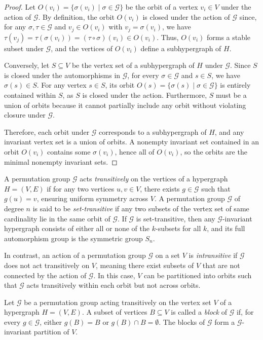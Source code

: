 \begin{proof}
Let $O(v_i)=\{\sigma(v_i)\mid\sigma\in\mathcal{G}\}$ be the orbit of a vertex $v_i\in V$ under the action of $\mathcal{G}$. By definition, the orbit $O(v_i)$ is closed under the action of $\mathcal{G}$ since, for any $\sigma,\tau\in\mathcal{G}$ and $v_j\in O(v_i)$ with $v_j=\sigma(v_i)$, we have $\tau(v_j)=\tau(\sigma(v_i))=(\tau\circ\sigma)(v_i)\in O(v_i)$. Thus, $O(v_i)$ forms a stable subset under $\mathcal{G}$, and the vertices of $O(v_i)$ define a subhypergraph of $H$.

Conversely, let $S\subseteq V$ be the vertex set of a subhypergraph of $H$ under $\mathcal{G}$. Since $S$ is closed under the automorphisms in $\mathcal{G}$, for every $\sigma\in\mathcal{G}$ and $s\in S$, we have $\sigma(s)\in S$. For any vertex $s\in S$, its orbit $O(s)=\{\sigma(s)\mid\sigma\in\mathcal{G}\}$ is entirely contained within $S$, as $S$ is closed under the action. Furthermore, $S$ must be a union of orbits because it cannot partially include any orbit without violating closure under $\mathcal{G}$.

Therefore, each orbit under $\mathcal{G}$ corresponds to a subhypergraph of $H$, and any invariant vertex set is a union of orbits. A nonempty invariant set contained in an orbit $O(v_i)$ contains some $\sigma(v_i)$, hence all of $O(v_i)$, so the orbits are the minimal nonempty invariant sets.
\end{proof}

A permutation group $\mathcal{G}$ acts \emph{transitively} on the vertices of a hypergraph $H=(V,E)$ if for any two vertices $u,v\in V$, there exists $g\in\mathcal{G}$ such that $g(u)=v$, ensuring uniform symmetry across $V$. A permutation group $\mathcal{G}$ of degree $n$ is said to be \emph{set-transitive} if any two subsets of the vertex set of same cardinality lie in the same orbit of $\mathcal{G}$. If $\mathcal{G}$ is set-transitive, then any $\mathcal{G}$-invariant hypergraph consists of either all or none of the $k$-subsets for all $k$, and its full automorphism group is the symmetric group $S_n$.

In contrast, an action of a permutation group $\mathcal{G}$ on a set $V$ is \emph{intransitive} if $\mathcal{G}$ does not act transitively on $V$, meaning there exist subsets of $V$ that are not connected by the action of $\mathcal{G}$. In this case, $V$ can be partitioned into orbits such that $\mathcal{G}$ acts transitively within each orbit but not across orbits.

\begin{definition}
Let $\mathcal{G}$ be a permutation group acting transitively on the vertex set $V$ of a hypergraph $H=(V,E)$. A subset of vertices $B\subseteq V$ is called a \emph{block} of $\mathcal{G}$ if, for every $g\in\mathcal{G}$, either $g(B)=B$ or $g(B)\cap B=\emptyset$. The blocks of $\mathcal{G}$ form a $\mathcal{G}$-invariant partition of $V$.
\end{definition}

